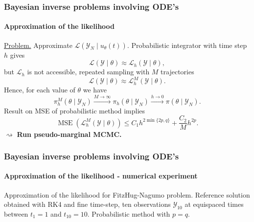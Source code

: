 \documentclass{beamer}
\newcommand{\diffL}{\mathcal{L}}
\newcommand{\MSE}{\operatorname{MSE}}
\begin{document}
\begin{frame}
	\frametitle{Bayesian inverse problems involving ODE's}
	\framesubtitle{Approximation of the likelihood}
	
	\underline{Problem.} Approximate $\mathcal{L}(\mathcal Y_N\mid u_\theta(t))$. Probabilistic integrator with time step $h$ gives 
	\begin{equation*}
		\diffL(\mathcal Y\mid\theta) \approx \diffL_h(\mathcal Y\mid\theta),
	\end{equation*} 
	but $\diffL_h$ is not accessible, repeated sampling with $M$ trajectories
	\begin{equation*}
		\diffL(\mathcal Y\mid\theta) \approx \diffL^M_h(\mathcal Y\mid\theta).
	\end{equation*}
	Hence, for each value of $\theta$ we have 
	\begin{equation*}
		\pi^M_h(\theta\mid\mathcal Y_N) \xrightarrow{M\to\infty} \pi_h(\theta\mid\mathcal Y_N) \xrightarrow{h\to 0} \pi(\theta\mid\mathcal Y_N).
	\end{equation*}
	Result on MSE of probabilistic method implies 
	\begin{equation*}
		\MSE(\diffL_h^M (\mathcal Y \mid \theta)) \leq C_1 h^{2\min\{2p, q\}} + \frac{C_2}{M} h^{2p}.
	\end{equation*}
	$\rightsquigarrow$ \textbf{Run pseudo-marginal MCMC.}
\end{frame}

\begin{frame}
	\frametitle{Bayesian inverse problems involving ODE's}
	\framesubtitle{Approximation of the likelihood - numerical experiment}
	
	\begin{figure}
		\centering
		\resizebox{0.6\linewidth}{!}{}
	\end{figure}	
	Approximation of the likelihood for FitzHug-Nagumo problem. Reference solution obtained with RK4 and fine time-step, ten observations $\mathcal{Y}_{10}$ at equispaced times between $t_1 = 1$ and $t_{10} = 10$. Probabilistic method with $p = q$.
\end{frame}
\end{document}
